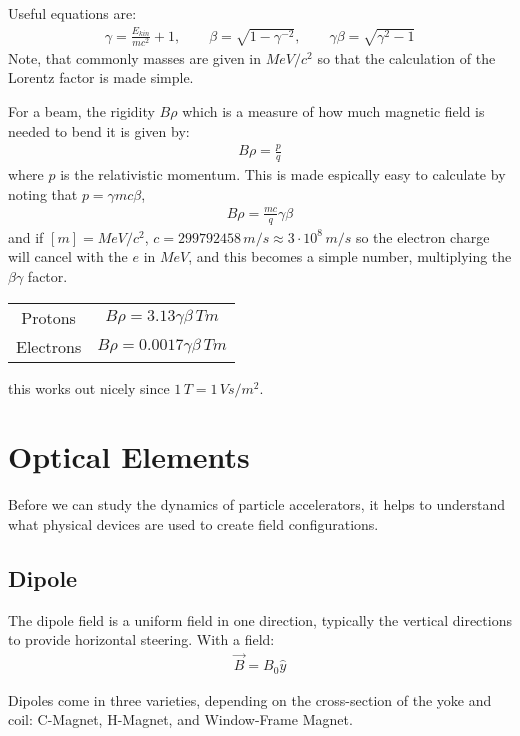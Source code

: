 \documentclass{article}
\numberwithin{equation}{section}
\begin{document}
Useful equations are:
\begin{align}
\gamma = \frac{E_{kin}}{m c^2}+1 , \qquad \beta = \sqrt{1-\gamma^{-2}} ,\qquad \gamma \beta = \sqrt{\gamma^2-1}
\end{align}
Note, that commonly masses are given in $\si{MeV/c^2}$ so that the calculation of the Lorentz factor is made simple. 

For a beam, the rigidity $B \rho$ which is a measure of how much magnetic field is needed to bend it is given by:
\begin{align}
B \rho = \frac{p}{q}
\end{align}
where $p$ is the relativistic momentum. This is made espically easy to calculate by noting that $p = \gamma m c \beta$, 
\begin{align}
B \rho = \frac{m c}{q} \gamma \beta
\end{align}
and if $[m] = \si{MeV/c^2}$, $c = 299792458 \, \si{m/s} \approx 3 \cdot 10^8 \, \si{m/s}$ so the electron charge will cancel with the $\si{e}$ in $\si{MeV}$, and this becomes a simple number, multiplying the $\beta \gamma$ factor.
\begin{center}
\begin{tabular}{ c c }
Protons & $B \rho = 3.13  \gamma \beta \, \si{T m}$ \\ 
Electrons & $B \rho = 0.0017  \gamma \beta \, \si{T m}$ \\
\end{tabular}
\end{center}
this works out nicely since $1 \, \si{T} = 1 \, \si{V s / m^{2}}$.

\section{Optical Elements}

Before we can study the dynamics of particle accelerators, it helps to understand what physical devices are used to create field configurations.

\subsection{Dipole}
The dipole field is a uniform field in one direction, typically the vertical directions to provide horizontal steering. With a field:
\begin{align}
\vec{B} = B_0 \hat{y}
\end{align}


Dipoles come in three varieties, depending on the cross-section of the yoke and coil: C-Magnet, H-Magnet, and Window-Frame Magnet.
\end{document}
